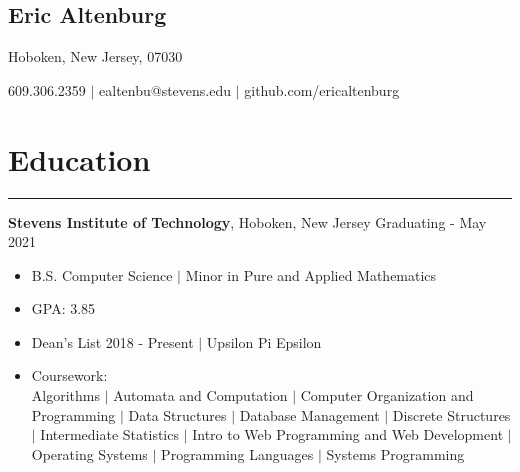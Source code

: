 \documentclass[10pt]{article}
\newcommand{\name}[1]{\begin{center}\section*{\huge #1}\end{center}}
\newcommand{\topinfo}[1]{\begin{center}\vspace{-0.15cm}#1\vspace{-0.15cm}\end{center}}
\newcommand{\resumesection}[1]{\vspace{-0.2cm}\section*{#1}\vspace{-0.2cm}\hrule\vspace{0.2cm}}
\begin{document}
\name{Eric Altenburg}
\topinfo{Hoboken, New Jersey, 07030}

\topinfo{609.306.2359 $\vert$ ealtenbu@stevens.edu $\vert$ github.com/ericaltenburg}








\resumesection{Education}
\textbf{Stevens Institute of Technology}, Hoboken, New Jersey \hfill Graduating - May 2021
\begin{itemize}
	\item B.S. Computer Science $\vert$ Minor in Pure and Applied Mathematics
	\item GPA: 3.85 
	\item Dean's List 2018 - Present $\vert$ Upsilon Pi Epsilon 
	\item Coursework:\\
		Algorithms $\vert$ Automata and Computation $\vert$ Computer Organization and Programming $\vert$ Data Structures $\vert$ Database Management $\vert$ Discrete Structures $\vert$ Intermediate Statistics $\vert$ Intro to Web Programming and Web Development $\vert$ Operating Systems $\vert$ Programming Languages $\vert$ Systems Programming
\end{itemize}
\end{document}
